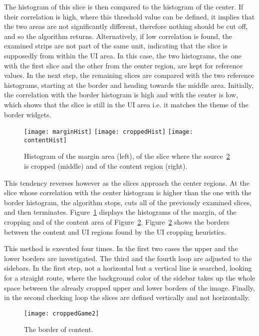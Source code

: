 \documentclass[draft,final]{vutinfth} %
\begin{document}
	The histogram of this slice is then compared to the histogram of the center.
	If their correlation is high, where this threshold value can be defined, it implies that the two areas are not significantly different, therefore nothing should be cut off, and so the algorithm returns.
	Alternatively, if low correlation is found, the examined strips are not part of the same unit, indicating that the slice is supposedly from within the UI area.
	In this case, the two histograms, the one with the first slice and the other from the center region, are kept for reference values.
	In the next step, the remaining slices are compared with the two reference histograms, starting at the border and heading towards the middle area.
	Initially, the correlation with the border histogram is high and with the center is low, which shows that the slice is still in the UI area i.e. it matches the theme of the border widgets.
	\begin{figure}[H]
		\texttt{[image: marginHist]}\hfill
		\texttt{[image: croppedHist]}\hfill
		\texttt{[image: contentHist]}
		\caption{Histogram of the margin area (left), of the slice where the source~\ref{fig:cropped} is cropped (middle) and of the content region (right).}
		\label{fig:hist}
	\end{figure}
	This tendency reverses however as the slices approach the center regions.
	At the slice whose correlation with the center histogram is higher than the one with the border histogram, the algorithm stops, cuts all of the previously examined slices, and then terminates.
	Figure~\ref{fig:hist} displays the histograms of the margin, of the cropping and of the content area of Figure~\ref{fig:cropped}.
	Figure~\ref{fig:cropped} shows the borders between the content and UI regions found by the UI cropping heuristics.\par 	
	This method is executed four times.
	In the first two cases the upper and the lower borders are investigated.
	The third and the fourth loop are adjusted to the sidebars.
	In the first step, not a horizontal but a vertical line is searched, looking for a straight route, where the background color of the sidebar takes up the whole space between the already cropped upper and lower borders of the image.
	Finally, in the second checking loop the slices are defined vertically and not horizontally.
	\begin{figure}[H]
		\centering		
		\texttt{[image: croppedGame2]}
		\caption{The border of content.}
		\label{fig:cropped}
	\end{figure}
\end{document}
